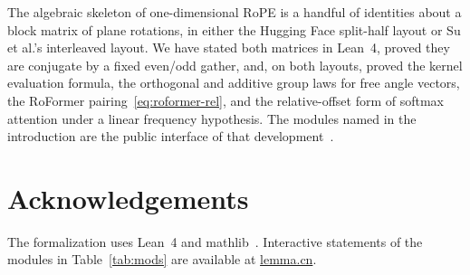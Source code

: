 \documentclass[11pt,a4paper]{article}
\begin{document}
The algebraic skeleton of one-dimensional RoPE is a handful of identities about a block matrix of plane rotations, in either the Hugging Face split-half layout or Su et al.'s interleaved layout.
We have stated both matrices in Lean~4, proved they are conjugate by a fixed even/odd gather, and, on both layouts, proved the kernel evaluation formula, the orthogonal and additive group laws for free angle vectors, the RoFormer pairing~\eqref{eq:roformer-rel}, and the relative-offset form of softmax attention under a linear frequency hypothesis.
The modules named in the introduction are the public interface of that development~\cite{lemma_rope_rel,lemma_rope_pair,lemma_rope_conj,lemma_rope_real,lemma_rope_add,lemma_rope_orth}.

\section*{Acknowledgements}

The formalization uses Lean~4 and mathlib~\cite{moura2021lean4,mathlib2020}.
Interactive statements of the modules in Table~\ref{tab:mods} are available at \href{http://www.lemma.cn/}{lemma.cn}.



\end{document}
